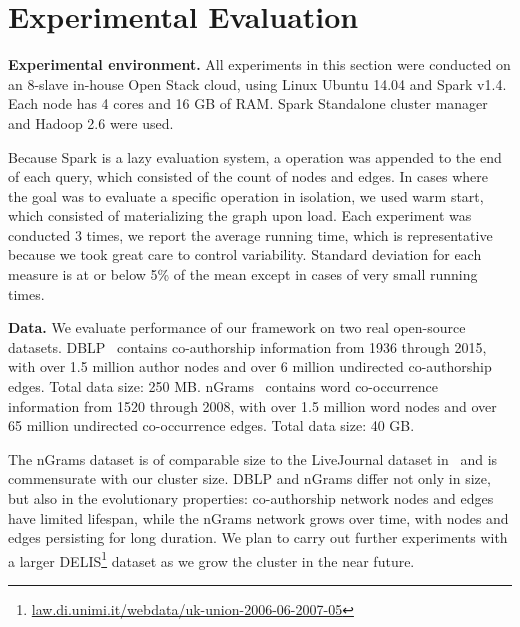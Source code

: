 \section{Experimental Evaluation}
\label{sec:exp}

{\bf Experimental environment.} All experiments in this section were
conducted on an 8-slave in-house Open Stack cloud, using Linux Ubuntu
14.04 and Spark v1.4.  Each node has 4 cores and 16 GB of RAM.  Spark
Standalone cluster manager and Hadoop 2.6 were used.

Because Spark is a lazy evaluation system, a 
operation was appended to the end of each query, which consisted of
the count of nodes and edges.  In cases where the goal was to evaluate
a specific operation in isolation, we used warm start, which consisted
of materializing the graph upon load.  Each experiment was conducted 3
times, we report the average running time, which is representative
because we took great care to control variability.  Standard deviation
for each measure is at or below 5\% of the mean except in cases of
very small running times.

{\bf Data.}  We evaluate performance of our framework on two real
open-source datasets.
DBLP~\cite{dblp} contains co-authorship information from 1936 through
2015, with over 1.5 million author nodes and over 6 million undirected
co-authorship edges.  Total data size: 250 MB.
%
nGrams~\cite{nGrams} contains word co-occurrence information from 1520
through 2008, with over 1.5 million word nodes and over 65 million
undirected co-occurrence edges.  Total data size: 40 GB.  

The nGrams dataset is of comparable size to the LiveJournal dataset
in~\cite{Xin2013} and is commensurate with our cluster size.  DBLP and
nGrams differ not only in size, but also in the evolutionary
properties: co-authorship network nodes and edges have limited
lifespan, while the nGrams network grows over time, with nodes and
edges persisting for long duration.    We plan to
carry out further experiments with a larger
DELIS\footnote{\url{law.di.unimi.it/webdata/uk-union-2006-06-2007-05}}
dataset as we grow the cluster in the near future.


